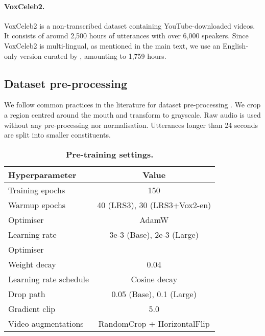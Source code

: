 \documentclass{article} \usepackage{iclr2023_conference,times}
\begin{document}
\paragraph{VoxCeleb2.} VoxCeleb2 \citep{DBLP:conf/interspeech/ChungNZ18} is a non-transcribed dataset containing YouTube-downloaded videos. It consists of around 2,500 hours of utterances with over 6,000 speakers. Since VoxCeleb2 is multi-lingual, as mentioned in the main text, we use an English-only version curated by \citet{shi2022learning}, amounting to 1,759 hours.
\subsection{Dataset pre-processing}
We follow common practices in the literature for dataset pre-processing \citep{ma2022visual, shi2022learning, martinez2020lipreading}. We crop a  region centred around the mouth and transform to grayscale. Raw audio is used without any pre-processing nor normalisation. Utterances longer than 24 seconds are split into smaller constituents.

\begin{table}
\centering
\begin{tabular}[b]{l | c}
Hyperparameter & Value \\ \midrule
Training epochs & 150 \\
Warmup epochs & 40 (LRS3), 30 (LRS3+Vox2-en) \\
Optimiser & AdamW \\
Learning rate & 3e-3 (Base), 2e-3 (Large) \\
Optimiser  &  \\
Weight decay & 0.04 \\
Learning rate schedule & Cosine decay \\
Drop path & 0.05 (Base), 0.1 (Large)  \\
Gradient clip & 5.0 \\
Video augmentations & RandomCrop + HorizontalFlip
\end{tabular}
\caption{\textbf{Pre-training settings.}}
\label{table:pretrain_settings}
\end{table}
\end{document}

